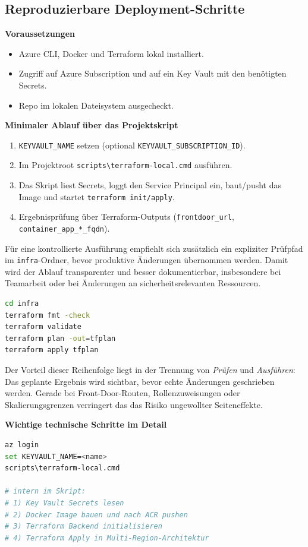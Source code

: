 \documentclass[a4paper,11pt]{article}
\begin{document}
\subsection{Reproduzierbare Deployment-Schritte}
\textbf{Voraussetzungen}
\begin{itemize}
  \item Azure CLI, Docker und Terraform lokal installiert.
  \item Zugriff auf Azure Subscription und auf ein Key Vault mit den benötigten Secrets.
  \item Repo im lokalen Dateisystem ausgecheckt.
\end{itemize}

\textbf{Minimaler Ablauf über das Projektskript}
\begin{enumerate}
  \item \texttt{KEYVAULT\_NAME} setzen (optional \texttt{KEYVAULT\_SUBSCRIPTION\_ID}).
  \item Im Projektroot \texttt{scripts\textbackslash terraform-local.cmd} ausführen.
  \item Das Skript liest Secrets, loggt den Service Principal ein, baut/pusht das Image und startet \texttt{terraform init/apply}.
  \item Ergebnisprüfung über Terraform-Outputs (\texttt{frontdoor\_url}, \texttt{container\_app\_*\_fqdn}).
\end{enumerate}

Für eine kontrollierte Ausführung empfiehlt sich zusätzlich ein expliziter Prüfpfad im \texttt{infra}-Ordner, bevor produktive Änderungen übernommen werden. Damit wird der Ablauf transparenter und besser dokumentierbar, insbesondere bei Teamarbeit oder bei Änderungen an sicherheitsrelevanten Ressourcen.

\begin{lstlisting}[language=bash,caption={Empfohlener IaC-Prüfpfad vor produktivem Apply}]
cd infra
terraform fmt -check
terraform validate
terraform plan -out=tfplan
terraform apply tfplan
\end{lstlisting}

Der Vorteil dieser Reihenfolge liegt in der Trennung von \textit{Prüfen} und \textit{Ausführen}: Das geplante Ergebnis wird sichtbar, bevor echte Änderungen geschrieben werden. Gerade bei Front-Door-Routen, Rollenzuweisungen oder Skalierungsgrenzen verringert das das Risiko ungewollter Seiteneffekte.

\textbf{Wichtige technische Schritte im Detail}
\begin{lstlisting}[language=bash,caption={Konzeptioneller Deployment-Ablauf}]
az login
set KEYVAULT_NAME=<name>
scripts\terraform-local.cmd

# intern im Skript:
# 1) Key Vault Secrets lesen
# 2) Docker Image bauen und nach ACR pushen
# 3) Terraform Backend initialisieren
# 4) Terraform Apply in Multi-Region-Architektur
\end{lstlisting}
\end{document}

